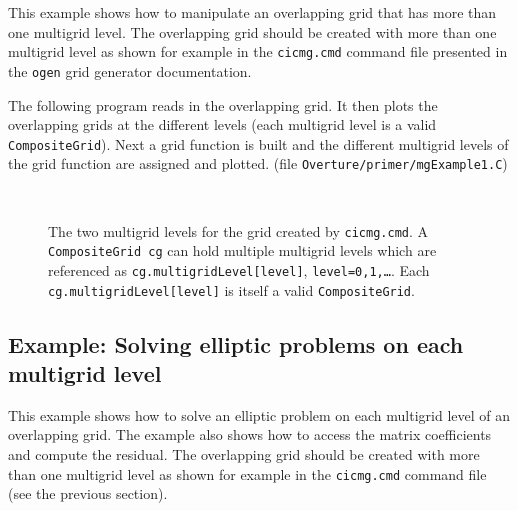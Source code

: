 \documentclass{article}
\begin{document}
This example shows how to manipulate an overlapping grid that has more than
one multigrid level. The overlapping grid should be created with more than one 
multigrid level as shown for example in the {\tt cicmg.cmd} command file presented
in the {\tt ogen} grid generator documentation.


The following program reads in the overlapping grid. It then plots the overlapping grids
at the different levels (each multigrid level is a valid {\tt CompositeGrid}).
Next a grid function is built and the different multigrid levels of the grid function
are assigned and plotted.
(file {\tt Overture/primer/mgExample1.C})
{\footnotesize
{}
}

\begin{figure}[htb]
\centering
 \mbox{
       }
 \caption{The two multigrid levels for the grid created by {\tt cicmg.cmd}. A {\tt Composite\-Grid cg}
        can hold multiple multigrid levels which are referenced as {\tt cg.multigridLevel[level]},
        {\tt level=0,1,\ldots}.
        Each {\tt cg.multigridLevel[level]} is itself a valid {\tt CompositeGrid}. }
\end{figure}

\clearpage
\subsection{Example: Solving elliptic problems on each multigrid level}

This example shows how to solve an elliptic problem on each multigrid level of an overlapping
grid. The example also shows how to access the matrix coefficients and compute
the residual. The overlapping grid should be created with more than one 
multigrid level as shown for example in the {\tt cicmg.cmd} command file (see the previous section).
\end{document}
